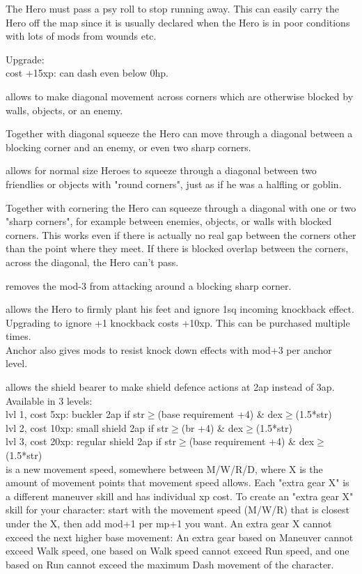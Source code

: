 The Hero must pass a psy roll to stop running away. This can easily carry the Hero off the map since it is usually declared when the Hero is in poor conditions with lots of mods from wounds etc.

Upgrade:\\
cost +15xp: can dash even below 0hp.


 allows to make diagonal movement across corners which are otherwise blocked by walls, objects, or an enemy.

Together with diagonal squeeze the Hero can move through a diagonal between a blocking corner and an enemy, or even two sharp corners.


 allows for normal size Heroes to squeeze through a diagonal between two friendlies or objects with "round corners", just as if he was a halfling or goblin.

Together with cornering the Hero can squeeze through a diagonal with one or two "sharp corners", for example between enemies, objects, or walls with blocked corners. This works even if there is actually no real gap between the corners other than the point where they meet. If there is blocked overlap between the corners, across the diagonal, the Hero can't pass.


 removes the mod-3 from attacking around a blocking sharp corner.


 allows the Hero to firmly plant his feet and ignore 1sq incoming knockback effect.\\
Upgrading to ignore +1 knockback costs +10xp. This can be purchased multiple times.\\
Anchor also gives mods to resist knock down effects with mod+3 per anchor level.


 allows the shield bearer to make shield defence actions at 2ap instead of 3ap. Available in 3 levels:\\
lvl 1, cost 5xp: buckler 2ap if str$\geq$(base requirement +4) \& dex$\geq$(1.5*str)\\
lvl 2, cost 10xp: small shield 2ap if str$\geq$(br +4) \& dex$\geq$(1.5*str)\\
lvl 3, cost 20xp: regular shield 2ap if str$\geq$(base requirement +4) \& dex$\geq$(1.5*str)\\


 is a new movement speed, somewhere between M/W/R/D, where X is the amount of movement points that movement speed allows. Each "extra gear X" is a different maneuver skill and has individual xp cost. To create an "extra gear X" skill for your character: start with the movement speed (M/W/R) that is closest under the X, then add mod+1 per mp+1 you want. An extra gear X cannot exceed the next higher base movement: An extra gear based on Maneuver cannot exceed Walk speed, one based on Walk speed cannot exceed Run speed, and one based on Run cannot exceed the maximum Dash movement of the character.

